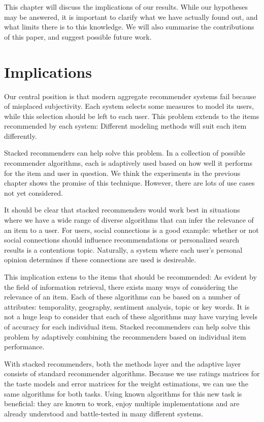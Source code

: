 \label{chap:discussion}

This chapter will discuss the implications of our results.
While our hypotheses may be answered,
it is important to clarify what we have actually found out,
and what limits there is to this knowledge.
We will also summarise the contributions of this paper,
and suggest possible future work.


\section{Implications}      

Our central position is that modern aggregate recommender systems fail because of misplaced subjectivity.
Each system selects some measures to model its users, while this selection should be left to each user.
This problem extends to the items recommended by each system: 
Different modeling methods will suit each item differently.

Stacked recommenders can help solve this problem.
In a collection of possible recommender algorithms, each is adaptively used based 
on how well it performs for the item and user in question.
We think the experiments in the previous chapter shows the promise of this technique.
However, there are lots of use cases not yet considered.

It should be clear that stacked recommenders would work best in situations where
we have a wide range of diverse algorithms that can infer the relevance of an item to a user.
For users, social connections is a good example: whether or not social connections should influence
recommendations or personalized search results is a contentious topic.
Naturally, a system where each user's personal opinion determines if these connections are used is desireable.

This implication extens to the items that should be recommended:
As evident by the field of information retrieval,
there exists many ways of considering the relevance of an item. 
Each of these algorithms can be based on a number of attributes:
temporality, geography, sentiment analysis, topic or key words.
It is not a huge leap to consider that each of these algorithms may have
varying levels of accuracy for each individual item.
Stacked recommenders can help solve this problem by adaptively 
combining the recommenders based on individual item performance.

With stacked recommenders, both the methods layer and the adaptive layer consists of standard recommender algorithms.
Because we use ratings matrices for the taste models and error matrices for the weight estimations,
we can use the same algorithms for both tasks.
Using known algorithms for this new task is beneficial:
they are known to work, enjoy multiple implementations
and are already understood and battle-tested in many different systems.

